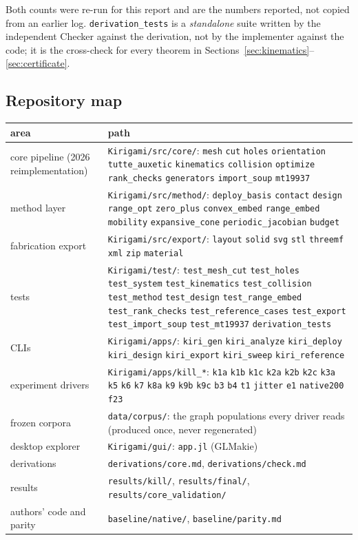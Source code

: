 \documentclass[11pt,a4paper]{article}
\theoremstyle{definition}
\newcommand{\file}[1]{\texttt{\small #1}}
\begin{document}
\noindent Both counts were re-run for this report and are the numbers reported, not copied
from an earlier log. \file{derivation\_tests} is a \emph{standalone} suite written by the
independent Checker against the derivation, not by the implementer against the code; it is the
cross-check for every theorem in Sections~\ref{sec:kinematics}--\ref{sec:certificate}.

\subsection{Repository map}

\begin{center}
\small
\begin{tabular}{@{}p{}p{}@{}}
\toprule
area & path \\
\midrule
core pipeline (2026 reimplementation) & \file{Kirigami/src/core/}: \file{mesh} \file{cut} \file{holes} \file{orientation} \file{tutte\_auxetic} \file{kinematics} \file{collision} \file{optimize} \file{rank\_checks} \file{generators} \file{import\_soup} \file{mt19937} \\
method layer & \file{Kirigami/src/method/}: \file{deploy\_basis} \file{contact} \file{design} \file{range\_opt} \file{zero\_plus} \file{convex\_embed} \file{range\_embed} \file{mobility} \file{expansive\_cone} \file{periodic\_jacobian} \file{budget} \\
fabrication export & \file{Kirigami/src/export/}: \file{layout} \file{solid} \file{svg} \file{stl} \file{threemf} \file{xml} \file{zip} \file{material} \\
tests & \file{Kirigami/test/}: \file{test\_mesh\_cut} \file{test\_holes} \file{test\_system} \file{test\_kinematics} \file{test\_collision} \file{test\_method} \file{test\_design} \file{test\_range\_embed} \file{test\_rank\_checks} \file{test\_reference\_cases} \file{test\_export} \file{test\_import\_soup} \file{test\_mt19937} \file{derivation\_tests} \\
CLIs & \file{Kirigami/apps/}: \file{kiri\_gen} \file{kiri\_analyze} \file{kiri\_deploy} \file{kiri\_design} \file{kiri\_export} \file{kiri\_sweep} \file{kiri\_reference} \\
experiment drivers & \file{Kirigami/apps/kill\_*}: \file{k1a} \file{k1b} \file{k1c} \file{k2a} \file{k2b} \file{k2c} \file{k3a} \file{k5} \file{k6} \file{k7} \file{k8a} \file{k9} \file{k9b} \file{k9c} \file{b3} \file{b4} \file{t1} \file{jitter} \file{e1} \file{native200} \file{f23} \\
frozen corpora & \file{data/corpus/}: the graph populations every driver reads (produced once, never regenerated) \\
desktop explorer & \file{Kirigami/gui/}: \file{app.jl} (GLMakie) \\
derivations & \file{derivations/core.md}, \file{derivations/check.md} \\
results & \file{results/kill/}, \file{results/final/}, \file{results/core\_validation/} \\
authors' code and parity & \file{baseline/native/}, \file{baseline/parity.md} \\
\bottomrule
\end{tabular}
\end{center}
\end{document}
